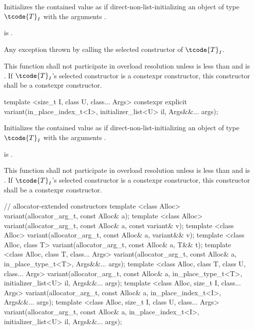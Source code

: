 \begin{itemdescr}
\pnum
\effects
Initializes the contained value as if direct-non-list-initializing
an object of type $\tcode{T}_I$
with the arguments .

\pnum
\postconditions
{} is .

\pnum
\throws
Any exception thrown by calling the selected constructor of $\tcode{T}_I$.

\pnum
\remarks
This function shall not participate in overload resolution unless  is
less than  and  is .
If $\tcode{T}_I$'s selected constructor is a constexpr constructor, this
constructor shall be a constexpr constructor.
\end{itemdescr}

%
\begin{itemdecl}
template <size_t I, class U, class... Args>
  constexpr explicit variant(in_place_index_t<I>, initializer_list<U> il, Args&&... args);
\end{itemdecl}

\begin{itemdescr}
\pnum
\effects
Initializes the contained value as if direct-non-list-initializing
an object of type $\tcode{T}_I$
with the arguments .

\pnum
\postconditions
{} is .

\pnum
\remarks
This function shall not participate in overload resolution unless  is
less than  and
 is .
If $\tcode{T}_I$'s selected constructor is a constexpr constructor, this
constructor shall be a constexpr constructor.
\end{itemdescr}

%
\begin{itemdecl}
// allocator-extended constructors
template <class Alloc>
  variant(allocator_arg_t, const Alloc& a);
template <class Alloc>
  variant(allocator_arg_t, const Alloc& a, const variant& v);
template <class Alloc>
  variant(allocator_arg_t, const Alloc& a, variant&& v);
template <class Alloc, class T>
  variant(allocator_arg_t, const Alloc& a, T&& t);
template <class Alloc, class T, class... Args>
  variant(allocator_arg_t, const Alloc& a, in_place_type_t<T>, Args&&... args);
template <class Alloc, class T, class U, class... Args>
  variant(allocator_arg_t, const Alloc& a, in_place_type_t<T>,
          initializer_list<U> il, Args&&... args);
template <class Alloc, size_t I, class... Args>
  variant(allocator_arg_t, const Alloc& a, in_place_index_t<I>, Args&&... args);
template <class Alloc, size_t I, class U, class... Args>
  variant(allocator_arg_t, const Alloc& a, in_place_index_t<I>,
          initializer_list<U> il, Args&&... args);
\end{itemdecl}

